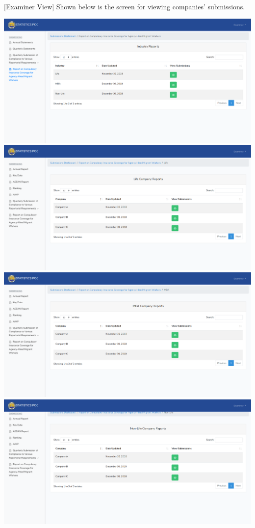\documentclass{article}
\begin{document}
[Examiner View] Shown below is the screen for viewing
companies’ submissions.%

\includegraphics[keepaspectratio=true]{up-ic-screens/image187}{}\includegraphics[keepaspectratio=true]{up-ic-screens/image13}{}\includegraphics[keepaspectratio=true]{up-ic-screens/image63}{}\includegraphics[keepaspectratio=true]{up-ic-screens/image174}{}%
\end{document}
